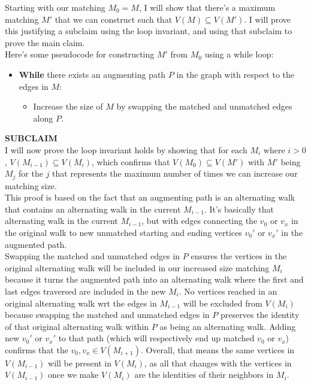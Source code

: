 \documentclass[11pt]{article}
\begin{document}
\begin{enumerate}
\begin{enumerate}
            Starting with our matching $M_0 = M$, I will show that there's a maximum matching $M'$ that we can construct such that $V(M)\subseteq V(M')$. I will prove this justifying a subclaim using the loop invariant, and using that subclaim to prove the main claim. \\
            
Here's some pseudocode for constructing $M'$ from $M_0$ using a while loop:

\begin{itemize}
    \item \textbf{While} there exists an augmenting path $P$ in the graph with respect to the edges in $M$:
    \begin{itemize}
        \item Increase the size of $M$ by swapping the matched and unmatched edges along $P$. \\
    \end{itemize} 
\end{itemize} 

            \textbf{SUBCLAIM} \\

            I will now prove the loop invariant holds by showing that for each $M_i$ where $i > 0$, $V(M_{i-1}) \subseteq V(M_i)$, which confirms that $V(M_0) \subseteq V(M')$ with $M'$ being $M_j$ for the $j$ that represents the maximum number of times we can increase our matching size. \\

            This proof is based on the fact that an augmenting path is an alternating walk that contains an alternating walk in the current $M_{i-1}$. It's basically that alternating walk in the current $M_{i-1}$, but with edges connecting the $v_0$ or $v_x$ in the original walk to new unmatched starting and ending vertices $v_0'$ or $v_x'$ in the augmented path. \\
            
            Swapping the matched and unmatched edges in $P$ ensures the vertices in the original alternating walk will be included in our increased size matching $M_i$ because it turns the augmented path into an alternating walk where the first and last edges traversed are included in the new $M_i$. No vertices reached in an original alternating walk wrt the edges in $M_{i-1}$ will be excluded from $V(M_i)$ because swapping the matched and unmatched edges in $P$ preserves the identity of that original alternating walk within $P$ as being an alternating walk. Adding new $v_0'$ or $v_x'$ to that path (which will respectively end up matched $v_0$ or $v_x$) confirms that the ${v_0, v_x} \in V(M_{i+1})$. Overall, that means the same vertices in $V(M_{i-1})$ will be present in $V(M_{i})$, as all that changes with the vertices in $V(M_{i-1})$ once we make $V(M_{i})$ are the identities of their neighbors in $M_i$. \\
            

\end{enumerate}
\end{enumerate}
\end{document}
